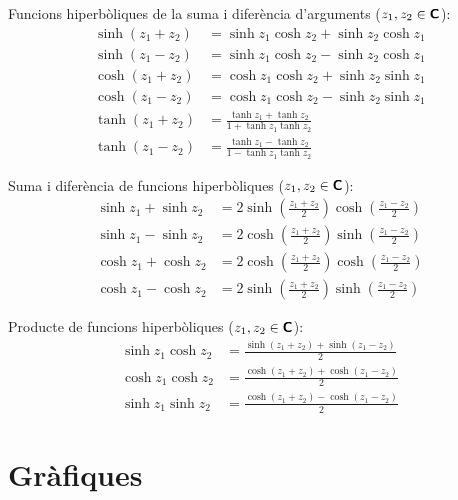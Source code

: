 Funcions hiperbòliques de la suma i diferència d'arguments ($z_1,
z_2\in{\ensuremath{\boldsymbol{\mathsf{C}}}}$):
\begin{subequations}
\begin{align}
    \sinh(z_1+z_2) &= \sinh z_1 \cosh z_2 + \sinh z_2\cosh z_1\\[1ex]
    \sinh(z_1-z_2) &= \sinh z_1 \cosh z_2 - \sinh z_2\cosh z_1\\[1ex]
    \cosh(z_1+z_2) &= \cosh z_1 \cosh z_2 + \sinh z_2\sinh z_1\\[1ex]
    \cosh(z_1-z_2) &= \cosh z_1 \cosh z_2 - \sinh z_2\sinh z_1\\[1ex]
    \tanh(z_1+z_2) &=\frac{\tanh z_1+\tanh z_2}{1+\tanh z_1\tanh z_2}\\[1ex]
    \tanh(z_1-z_2) &=\frac{\tanh z_1-\tanh z_2}{1-\tanh z_1\tanh z_2}
\end{align}
\end{subequations}

Suma i diferència de funcions hiperbòliques ($z_1,
z_2\in{\ensuremath{\boldsymbol{\mathsf{C}}}}$):
\begin{subequations}
\begin{align}
    \sinh z_1+\sinh z_2 &= 2 \sinh\left(\frac{z_1+z_2}{2}\right)
    \cosh\left(\frac{z_1-z_2}{2}\right)\\[1ex]
    \sinh z_1-\sinh z_2 &= 2 \cosh\left(\frac{z_1+z_2}{2}\right)
    \sinh\left(\frac{z_1-z_2}{2}\right)\\[1ex]
    \cosh z_1+\cosh z_2 &= 2 \cosh\left(\frac{z_1+z_2}{2}\right)
    \cosh\left(\frac{z_1-z_2}{2}\right)\\[1ex]
    \cosh z_1-\cosh z_2 &= 2 \sinh\left(\frac{z_1+z_2}{2}\right)
    \sinh\left(\frac{z_1-z_2}{2}\right)
\end{align}
\end{subequations}

Producte de funcions hiperbòliques ($z_1, z_2\in{\ensuremath{\boldsymbol{\mathsf{C}}}}$):
\begin{subequations}
\begin{align}
    \sinh z_1 \cosh z_2 &=
    \frac{\sinh(z_1+z_2)+\sinh(z_1-z_2)}{2}\\[1ex]
    \cosh z_1 \cosh z_2 &=
    \frac{\cosh(z_1+z_2)+\cosh(z_1-z_2)}{2}\\[1ex]
    \sinh z_1 \sinh z_2 &=
    \frac{\cosh(z_1+z_2)-\cosh(z_1-z_2)}{2}
\end{align}
\end{subequations}


\section{Gràfiques}\label{sec:trig-grafics}

